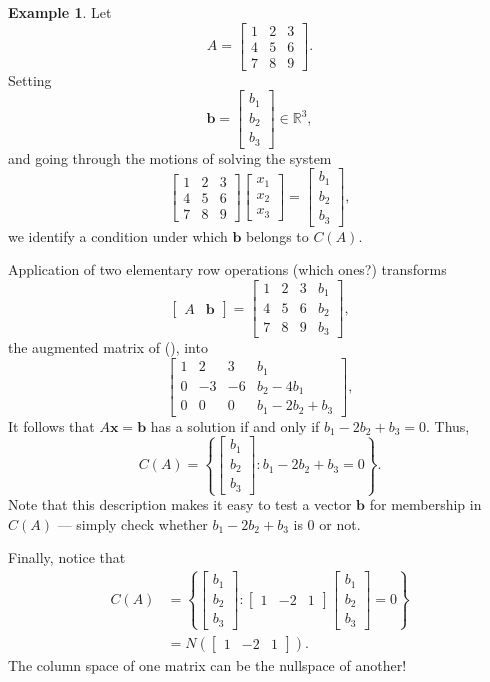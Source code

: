 \documentclass[12pt]{amsart}
\newcommand{\RR}{\mathbb{R}}
\theoremstyle{definition} \newtheorem{definition}[theorem]{Definition}
\newtheorem{example}[theorem]{Example}
\newcommand{\bb}{\mathbf{b}}
\newcommand{\bx}{\mathbf{x}}
\newcommand{\mat}[1]{\begin{bmatrix}#1\end{bmatrix}}
\begin{document}
\begin{example}\label{eg:nullspace}
  Let
  \[
    A = \mat{1&2&3\\4&5&6\\7&8&9}.
  \]
  Setting
  \[
    \bb=\mat{b_1\\b_2\\b_3}\in\RR^3,
  \]
  and going through the motions of solving the system
  \begin{equation*}
    \mat{1&2&3\\4&5&6\\7&8&9}\mat{x_1\\x_2\\x_3}=\mat{b_1\\b_2\\b_3},
    \tag{\maltese}
  \end{equation*}
  we identify a condition under which $\bb$ belongs to $C(A)$.

  Application of two elementary row operations (which ones?) transforms 
  \[
    \mat{A&\bb}=\mat{1&2&3&b_1\\4&5&6&b_2\\7&8&9&b_3},
  \]
  the augmented matrix of (\maltese), into
  \[
    \mat{1&2&3&b_1\\0&-3&-6&b_2-4b_1\\0&0&0&b_1-2b_2+b_3},
  \]
  It follows that $A\bx=\bb$ has a solution if and only if $b_1-2b_2+b_3 = 0$. Thus,
  \[
    C(A) = \left\{\mat{b_1\\b_2\\b_3} : b_1-2b_2+b_3=0\right\}.
  \]
  Note that this description makes it easy to test a vector $\bb$ for membership in $C(A)$ --- simply check whether $b_1-2b_2+b_3$ is $0$ or not.

  Finally, notice that
  \begin{align*}
    C(A) %
         &= \left\{\mat{b_1\\b_2\\b_3} :
         \mat{1&-2&1}\mat{b_1\\b_2\\b_3} = 0 \right\}\\
               &= N\left(\mat{1&-2&1}\right).
  \end{align*}
  The column space of one matrix can be the nullspace of another! 
\end{example}
\end{document}

